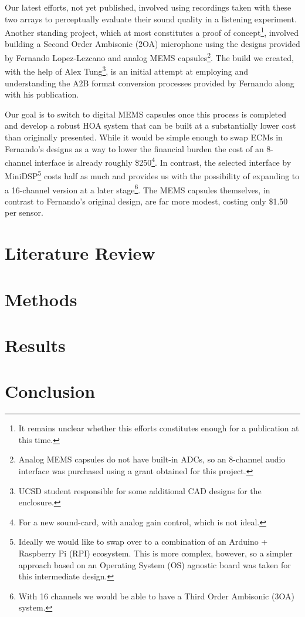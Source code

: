 Our latest efforts, not yet published, involved using recordings taken with these two arrays to perceptually evaluate their sound quality in a listening experiment. Another standing project, which at most constitutes a proof of concept\footnote{It remains unclear whether this efforts constitutes enough for a publication at this time.}, involved building a Second Order Ambisonic (2OA) microphone using the designs provided by Fernando Lopez-Lezcano \cite{lopez2019sphear} and analog MEMS capsules\footnote{Analog MEMS capsules do not have built-in ADCs, so an 8-channel audio interface was purchased using a grant obtained for this project.}. The build we created, with the help of Alex Tung\footnote{UCSD student responsible for some additional CAD designs for the enclosure.}, is an initial attempt at employing and understanding the A2B format conversion processes provided by Fernando along with his publication. 

Our goal is to switch to digital MEMS capsules once this process is completed and develop a robust HOA system that can be built at a substantially lower cost than originally presented. While it would be simple enough to swap ECMs in Fernando's designs as a way to lower the financial burden the cost of an 8-channel interface is already roughly \$250\footnote{For a new sound-card, with analog gain control, which is not ideal.}. In contrast, the selected interface by MiniDSP\footnote{Ideally we would like to swap over to a combination of an Arduino + Raspberry Pi (RPI) ecosystem. This is more complex, however, so a simpler approach based on an Operating System (OS) agnostic board was taken for this intermediate design.} costs half as much and provides us with the possibility of expanding to a 16-channel version at a later stage\footnote{With 16 channels we would be able to have a Third Order Ambisonic (3OA) system.}. The MEMS capsules themselves, in contrast to Fernando's original design, are far more modest, costing only \$1.50 per sensor. 


\section{Literature Review}




\section{Methods}

\section{Results}

\section{Conclusion}
